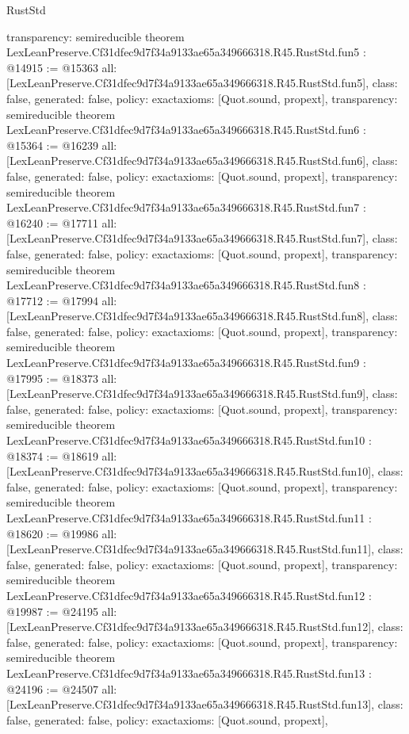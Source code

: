 \begin{lexlean}{RustStd}
\begin{coremodule}
{  transparency: semireducible
}
theorem LexLeanPreserve.Cf31dfec9d7f34a9133ae65a349666318.R45.RustStd.fun5 : @14915 := @15363 {
  all: [LexLeanPreserve.Cf31dfec9d7f34a9133ae65a349666318.R45.RustStd.fun5],
  class: false,
  generated: false,
  policy: exact{axioms: [Quot.sound, propext]},
  transparency: semireducible
}
theorem LexLeanPreserve.Cf31dfec9d7f34a9133ae65a349666318.R45.RustStd.fun6 : @15364 := @16239 {
  all: [LexLeanPreserve.Cf31dfec9d7f34a9133ae65a349666318.R45.RustStd.fun6],
  class: false,
  generated: false,
  policy: exact{axioms: [Quot.sound, propext]},
  transparency: semireducible
}
theorem LexLeanPreserve.Cf31dfec9d7f34a9133ae65a349666318.R45.RustStd.fun7 : @16240 := @17711 {
  all: [LexLeanPreserve.Cf31dfec9d7f34a9133ae65a349666318.R45.RustStd.fun7],
  class: false,
  generated: false,
  policy: exact{axioms: [Quot.sound, propext]},
  transparency: semireducible
}
theorem LexLeanPreserve.Cf31dfec9d7f34a9133ae65a349666318.R45.RustStd.fun8 : @17712 := @17994 {
  all: [LexLeanPreserve.Cf31dfec9d7f34a9133ae65a349666318.R45.RustStd.fun8],
  class: false,
  generated: false,
  policy: exact{axioms: [Quot.sound, propext]},
  transparency: semireducible
}
theorem LexLeanPreserve.Cf31dfec9d7f34a9133ae65a349666318.R45.RustStd.fun9 : @17995 := @18373 {
  all: [LexLeanPreserve.Cf31dfec9d7f34a9133ae65a349666318.R45.RustStd.fun9],
  class: false,
  generated: false,
  policy: exact{axioms: [Quot.sound, propext]},
  transparency: semireducible
}
theorem LexLeanPreserve.Cf31dfec9d7f34a9133ae65a349666318.R45.RustStd.fun10 : @18374 := @18619 {
  all: [LexLeanPreserve.Cf31dfec9d7f34a9133ae65a349666318.R45.RustStd.fun10],
  class: false,
  generated: false,
  policy: exact{axioms: [Quot.sound, propext]},
  transparency: semireducible
}
theorem LexLeanPreserve.Cf31dfec9d7f34a9133ae65a349666318.R45.RustStd.fun11 : @18620 := @19986 {
  all: [LexLeanPreserve.Cf31dfec9d7f34a9133ae65a349666318.R45.RustStd.fun11],
  class: false,
  generated: false,
  policy: exact{axioms: [Quot.sound, propext]},
  transparency: semireducible
}
theorem LexLeanPreserve.Cf31dfec9d7f34a9133ae65a349666318.R45.RustStd.fun12 : @19987 := @24195 {
  all: [LexLeanPreserve.Cf31dfec9d7f34a9133ae65a349666318.R45.RustStd.fun12],
  class: false,
  generated: false,
  policy: exact{axioms: [Quot.sound, propext]},
  transparency: semireducible
}
theorem LexLeanPreserve.Cf31dfec9d7f34a9133ae65a349666318.R45.RustStd.fun13 : @24196 := @24507 {
  all: [LexLeanPreserve.Cf31dfec9d7f34a9133ae65a349666318.R45.RustStd.fun13],
  class: false,
  generated: false,
  policy: exact{axioms: [Quot.sound, propext]},
}
\end{coremodule}
\end{lexlean}
